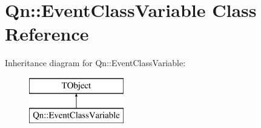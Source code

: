 \hypertarget{classQn_1_1EventClassVariable}{}\section{Qn\+:\+:Event\+Class\+Variable Class Reference}
\label{classQn_1_1EventClassVariable}
Inheritance diagram for Qn\+:\+:Event\+Class\+Variable\+:\begin{figure}[H]
\begin{center}
\leavevmode
\includegraphics[height=2.000000cm]{classQn_1_1EventClassVariable}
\end{center}
\end{figure}
